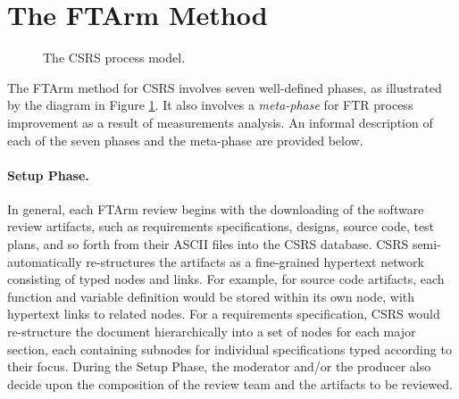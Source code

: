 


\newpage
\section{The FTArm Method}
\label{sidebar:csrs}

\begin{figure}
  {\centerline{}}
\caption{The CSRS process model.}
\label{fig:process-model}
\end{figure}

The FTArm method for CSRS involves seven well-defined phases,
as illustrated by the diagram in Figure \ref{fig:process-model}. It
also involves a {\em meta-phase} for FTR process improvement as a
result of measurements analysis.  An informal description of each of
the seven phases and the meta-phase are provided below.

\paragraph{Setup Phase.} 

In general, each FTArm review begins with the downloading of the
software review artifacts, such as requirements specifications,
designs, source code, test plans, and so forth from their ASCII files
into the CSRS database.  CSRS semi-automatically re-structures the
artifacts as a fine-grained hypertext network consisting of typed
nodes and links. For example, for source code artifacts, each function
and variable definition would be stored within its own node, with
hypertext links to related nodes.  For a requirements specification,
CSRS would re-structure the document hierarchically into a set of
nodes for each major section, each containing subnodes for individual
specifications typed according to their focus.  During the Setup
Phase, the moderator and/or the producer also decide upon the
composition of the review team and the artifacts to be reviewed.

